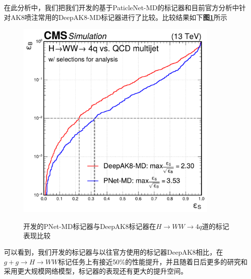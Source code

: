 在此分析中，我们把我们开发的基于PaticleNet-MD的标记器和目前官方分析中针对AK8喷注常用的DeepAK8-MD标记器进行了比较。比较结果如下\textbf{图\ref{fig:5.6}}所示
\begin{figure}[H]
 \centering\label{fig:5.6}
 \caption{开发的PNet-MD标记器与DeepAK8标记器在$H\to WW\to4q$道的标记表现比较}
 \includegraphics[height=10cm, width=10cm]{pictures/ana_roc_4q.pdf}
 \label{fig:5.6}
\end{figure}

可以看到，我们开发的标记器与以往官方使用的标记器DeepAK8相比，在$g+g\to H\to WW$标记任务上有接近50\%的性能提升，并且随着日后更多的研究和采用更大规模网络模型，标记器的表现还有更大的提升空间。

